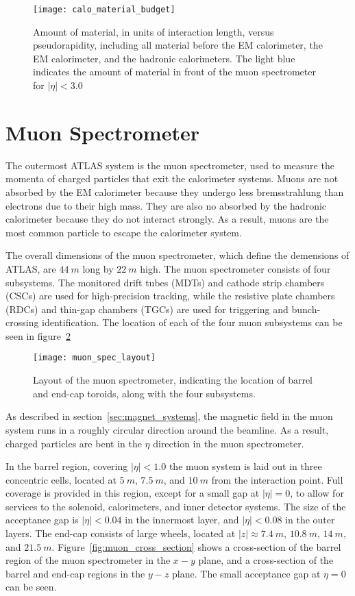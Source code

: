\begin{figure}[h]
\texttt{[image: calo\_material\_budget]}
\caption{Amount of material, in units of interaction length, versus pseudorapidity, including all material before the
EM calorimeter, the EM calorimeter, and the hadronic calorimeters. The light blue indicates the amount of material in front
of the muon spectrometer for $|\eta| < 3.0$}
\label{fig:calo_material_budget}\cite{atlas-detector-2008}
\end{figure}

\section{Muon Spectrometer}\label{sec:muon_spec}

The outermost ATLAS system is the muon spectrometer, used to measure the momenta of charged particles that exit the calorimeter systems.
Muons are not absorbed by the EM calorimeter because they undergo less bremsstrahlung than electrons due to their high mass.
They are also no absorbed by the hadronic calorimeter because they do not interact strongly.
As a result, muons are the most common particle to escape the calorimeter system.

The overall dimensions of the muon spectrometer, which define the demensions of ATLAS, are $44~m$ long by $22~m$ high.
The muon spectrometer consists of four subsystems.
The monitored drift tubes (MDTs) and cathode strip chambers (CSCs) are used for high-precision tracking,
while the resistive plate chambers (RDCs) and thin-gap chambers (TGCs) are used for triggering and bunch-crossing identification.
The location of each of the four muon subsystems can be seen in figure~\ref{fig:muon_spec_layout}

\begin{figure}[!htbp]
\texttt{[image: muon\_spec\_layout]}
\caption{Layout of the muon spectrometer, indicating the location of barrel and end-cap toroids, along with the four subsystems.}
\label{fig:muon_spec_layout}\cite{atlas-detector-2008}
\end{figure}

As described in section~\ref{sec:magnet_systems}, the magnetic field in the muon system runs in a roughly circular direction around the beamline.
As a result, charged particles are bent in the $\eta$ direction in the muon spectrometer.

In the barrel region, covering $|\eta| < 1.0$ the muon system is laid out in three concentric cells,
located at $5~m$, $7.5~m$, and $10~m$ from the interaction point.
Full coverage is provided in this region, except for a small gap at $|\eta| = 0$, to allow for services to the solenoid,
calorimeters, and inner detector systems.
The size of the acceptance gap is $|\eta| < 0.04$ in the innermost layer, and $|\eta| < 0.08$ in the outer layers.
The end-cap consists of large wheels, located at $|z| \approx 7.4~m$, $10.8~m$, $14~m$, and $21.5~m$.
Figure~\ref{fig:muon_cross_section} shows a cross-section of the barrel region of the muon spectrometer in the $x-y$ plane,
and a cross-section of the barrel and end-cap regions in the $y-z$ plane.
The small acceptance gap at $\eta = 0$ can be seen.

